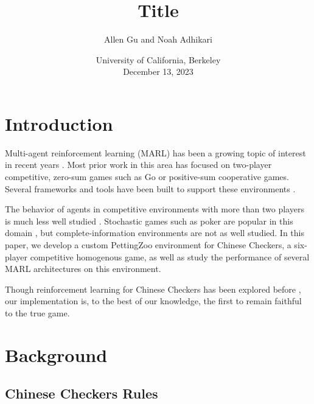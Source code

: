 \documentclass[12pt, a4paper, twocolumn]{article}
\title{Title}
\author{Allen Gu and Noah Adhikari}
\date{
    University of California, Berkeley\\[2ex] %
    December 13, 2023    
}
\newcommand{\abstractText}{\noindent
Abstract goes here.
}
\begin{document}

\twocolumn[
  \begin{@twocolumnfalse}
    \maketitle
    \begin{abstract}
      \abstractText
      \newline
      \newline
    \end{abstract}
  \end{@twocolumnfalse}
]


\section{Introduction}

Multi-agent reinforcement learning (MARL) has been a growing topic of interest in recent years \cite{GrowingMARLInterest}. Most prior work in this area has focused on two-player competitive, zero-sum games such as Go \cite{AlphaGo} or positive-sum cooperative games\cite{PositiveSumCoopGames}. Several frameworks and tools have been built to support these environments \cite{PettingZoo} \cite{Gym}. 

The behavior of agents in competitive environments with more than two players is much less well studied \cite{ArticleReference4}. Stochastic games such as poker are popular in this domain \cite{ArticleReference5}, but complete-information environments are not as well studied. In this paper, we develop a custom PettingZoo environment for Chinese Checkers, a six-player competitive homogenous game, as well as study the performance of several MARL architectures on this environment.


Though reinforcement learning for Chinese Checkers has been explored before \cite{ArticleReference6}, our implementation is, to the best of our knowledge, the first to remain faithful to the true game.

\section{Background}

\subsection{Chinese Checkers Rules}
\end{document}
